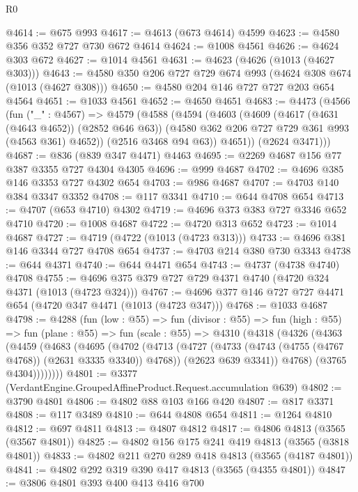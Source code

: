 \begin{lexlean}{R0}
\begin{coremodule}
@4614 := @675 @993
@4617 := @4613 (@673 @4614) @4599
@4623 := @4580 @356 @352 @727 @730 @672 @4614
@4624 := @1008 @4561
@4626 := @4624 @303 @672
@4627 := @1014 @4561
@4631 := @4623 (@4626 (@1013 (@4627 @303)))
@4643 := @4580 @350 @206 @727 @729 @674 @993 (@4624 @308 @674 (@1013 (@4627 @308)))
@4650 := @4580 @204 @146 @727 @727 @203 @654 @4564
@4651 := @1033 @4561
@4652 := @4650 @4651
@4683 := @4473
    (@4566
      (fun ("_" : @4567) =>
      @4579
        (@4588
          (@4594
            (@4603
              (@4609
                (@4617 (@4631 (@4643 @4652)) (@2852 @646 @63))
                (@4580 @362 @206 @727 @729 @361 @993 (@4563 @361) @4652))
              (@2516 @3468 @94 @63))
            @4651))
        (@2624 @3471)))
@4687 := @836 (@839 @347 @4471) @4463
@4695 := @2269 @4687 @156 @77 @387 @3355 @727 @4304 @4305
@4696 := @999 @4687
@4702 := @4696 @385 @146 @3353 @727 @4302 @654
@4703 := @986 @4687
@4707 := @4703 @140 @384 @3347 @3352
@4708 := @117 @3341
@4710 := @644 @4708 @654
@4713 := @4707 (@653 @4710) @4302
@4719 := @4696 @373 @383 @727 @3346 @652 @4710
@4720 := @1008 @4687
@4722 := @4720 @313 @652
@4723 := @1014 @4687
@4727 := @4719 (@4722 (@1013 (@4723 @313)))
@4733 := @4696 @381 @146 @3344 @727 @4708 @654
@4737 := @4703 @214 @380 @730 @3343
@4738 := @644 @4371
@4740 := @644 @4471 @654
@4743 := @4737 (@4738 @4740) @4708
@4755 := @4696 @375 @379 @727 @729 @4371 @4740 (@4720 @324 @4371 (@1013 (@4723 @324)))
@4767 := @4696 @377 @146 @727 @727 @4471 @654 (@4720 @347 @4471 (@1013 (@4723 @347)))
@4768 := @1033 @4687
@4798 := @4288
    (fun (low : @55) =>
    fun (divisor : @55) =>
    fun (high : @55) =>
    fun (plane : @55) =>
    fun (scale : @55) =>
    @4310
      (@4318
        (@4326
          (@4363
            (@4459
              (@4683
                (@4695
                  (@4702
                    (@4713
                      (@4727 (@4733 (@4743 (@4755 (@4767 @4768)) (@2631 @3335 @3340)) @4768))
                      (@2623 @639 @3341))
                    @4768)
                  (@3765 @4304))))))))
@4801 := @3377 (VerdantEngine.GroupedAffineProduct.Request.accumulation @639)
@4802 := @3790 @4801
@4806 := @4802 @88 @103 @166 @420
@4807 := @817 @3371
@4808 := @117 @3489
@4810 := @644 @4808 @654
@4811 := @1264 @4810
@4812 := @697 @4811
@4813 := @4807 @4812
@4817 := @4806 @4813 (@3565 (@3567 @4801))
@4825 := @4802 @156 @175 @241 @419 @4813 (@3565 (@3818 @4801))
@4833 := @4802 @211 @270 @289 @418 @4813 (@3565 (@4187 @4801))
@4841 := @4802 @292 @319 @390 @417 @4813 (@3565 (@4355 @4801))
@4847 := @3806 @4801 @393 @400 @413 @416 @700

\end{coremodule}
\end{lexlean}
